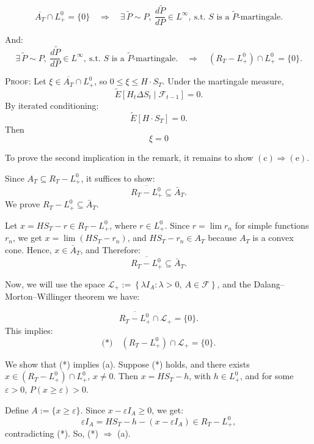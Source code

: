 \documentclass[review]{elsarticle}
\begin{document}
$$
\overline{A_T} \cap L^0_+ = \{0\}
\quad \Rightarrow \quad 
\exists\, \tilde{P} \sim P,\ \frac{d\tilde{P}}{dP} \in L^\infty,\ \text{s.t. } S \text{ is a } \tilde{P}\text{-martingale}.
$$



And:
\\
$$
\exists\, \tilde{P} \sim P,\ \frac{d\tilde{P}}{dP} \in L^\infty,\ \text{s.t. } S \text{ is a } \tilde{P}\text{-martingale}.
\quad \Rightarrow \quad 
(R_T - L^0_+) \cap L^0_+ = \{0\}.
$$



\textsc{Proof:}
Let $\xi \in \overline{A_T} \cap L_+^0$, so $0 \leq \xi \leq H \cdot S_T$.  
Under the martingale measure,
$$
\tilde{E}[H_t \Delta S_t \mid \mathcal{F}_{t-1}] = 0.
$$
By iterated conditioning:
$$
\tilde{E}[H \cdot S_T] = 0.
$$
Then $$\xi = 0$$

To prove the second implication in the remark, it remains to show $(\text{c}) \Rightarrow (\text{e})$.

Since $A_T \subseteq R_T - L_+^0$, it suffices to show: 
$$
\overline{R_T - L_+^0} \subseteq \bar{A}_T.
$$
We prove $R_T - L_+^0 \subseteq \bar{A}_T$.

Let $x = H S_T - r \in R_T - L_+^0$, where $r \in L_+^0$.  
Since $r = \lim r_n$ for simple functions $r_n$, we get  
$x = \lim(H S_T - r_n)$, and $H S_T - r_n \in A_T$ because $A_T$ is a convex cone.  
Hence, $x \in \bar{A}_T$, and Therefore:
$$
\overline{R_T - L_+^0} \subseteq \bar{A}_T.
$$

Now, we will use the space $\mathcal{L}_{+} := \left\{ \lambda I_A : \lambda > 0,\ A \in \mathcal{F} \right\}$, and the Dalang–Morton–Willinger theorem we have:

$$
\overline{R_T - L_+^0} \cap \mathcal{L}_+ = \{0\}.
$$
This implies:  
$$
\text{(*)} \quad (R_T - L_+^0) \cap \mathcal{L}_+ = \{0\}.
$$

\hspace{0.5cm}We show that (*) implies (a).  
Suppose (*) holds, and there exists  
$x \in (R_T - L_+^0) \cap L_+^0$, $x \neq 0$.  
Then $x = H S_T - h$, with $h \in L_+^0$, and for some $\varepsilon > 0$,  
$P(x \geq \varepsilon) > 0$.

Define $A := \{x \geq \varepsilon\}$. Since $x - \varepsilon I_A \geq 0$, we get:  
$$
\varepsilon I_A = H S_T - h - (x - \varepsilon I_A) \in R_T - L_+^0,
$$
contradicting (*). So, (*) $\Rightarrow$ (a).
\end{document}
